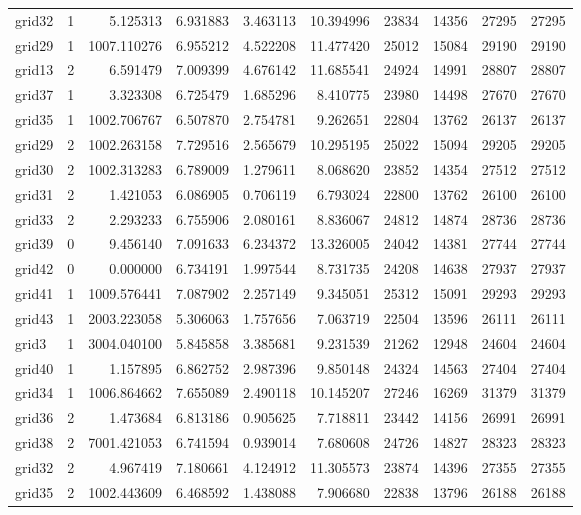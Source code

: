 \begin{longtable}{|l|r|r|r|r|r|r|r|r|r|}
grid32 & 1 & 5.125313 & 6.931883 & 3.463113 & 10.394996 & 23834 & 14356 & 27295 & 27295 \\
grid29 & 1 & 1007.110276 & 6.955212 & 4.522208 & 11.477420 & 25012 & 15084 & 29190 & 29190 \\
grid13 & 2 & 6.591479 & 7.009399 & 4.676142 & 11.685541 & 24924 & 14991 & 28807 & 28807 \\
grid37 & 1 & 3.323308 & 6.725479 & 1.685296 & 8.410775 & 23980 & 14498 & 27670 & 27670 \\
grid35 & 1 & 1002.706767 & 6.507870 & 2.754781 & 9.262651 & 22804 & 13762 & 26137 & 26137 \\
grid29 & 2 & 1002.263158 & 7.729516 & 2.565679 & 10.295195 & 25022 & 15094 & 29205 & 29205 \\
grid30 & 2 & 1002.313283 & 6.789009 & 1.279611 & 8.068620 & 23852 & 14354 & 27512 & 27512 \\
grid31 & 2 & 1.421053 & 6.086905 & 0.706119 & 6.793024 & 22800 & 13762 & 26100 & 26100 \\
grid33 & 2 & 2.293233 & 6.755906 & 2.080161 & 8.836067 & 24812 & 14874 & 28736 & 28736 \\
grid39 & 0 & 9.456140 & 7.091633 & 6.234372 & 13.326005 & 24042 & 14381 & 27744 & 27744 \\
grid42 & 0 & 0.000000 & 6.734191 & 1.997544 & 8.731735 & 24208 & 14638 & 27937 & 27937 \\
grid41 & 1 & 1009.576441 & 7.087902 & 2.257149 & 9.345051 & 25312 & 15091 & 29293 & 29293 \\
grid43 & 1 & 2003.223058 & 5.306063 & 1.757656 & 7.063719 & 22504 & 13596 & 26111 & 26111 \\
grid3 & 1 & 3004.040100 & 5.845858 & 3.385681 & 9.231539 & 21262 & 12948 & 24604 & 24604 \\
grid40 & 1 & 1.157895 & 6.862752 & 2.987396 & 9.850148 & 24324 & 14563 & 27404 & 27404 \\
grid34 & 1 & 1006.864662 & 7.655089 & 2.490118 & 10.145207 & 27246 & 16269 & 31379 & 31379 \\
grid36 & 2 & 1.473684 & 6.813186 & 0.905625 & 7.718811 & 23442 & 14156 & 26991 & 26991 \\
grid38 & 2 & 7001.421053 & 6.741594 & 0.939014 & 7.680608 & 24726 & 14827 & 28323 & 28323 \\
grid32 & 2 & 4.967419 & 7.180661 & 4.124912 & 11.305573 & 23874 & 14396 & 27355 & 27355 \\
grid35 & 2 & 1002.443609 & 6.468592 & 1.438088 & 7.906680 & 22838 & 13796 & 26188 & 26188 \\

\end{longtable}
